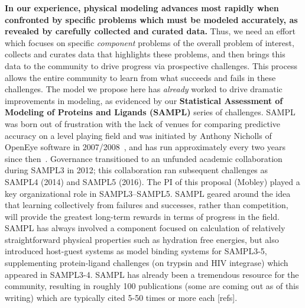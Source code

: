 \documentclass[11pt]{article}
\begin{document}
\textbf{In our experience, physical modeling advances most rapidly when confronted by specific problems which must be modeled accurately, as revealed by carefully collected and curated data.}
Thus, we need an effort which focuses on specific \emph{component} problems of the overall problem of interest, collects and curates data that highlights these problems, and then brings this data to the community to drive progress via prospective challenges.
This process allows the entire community to learn from what succeeds and fails in these challenges. 
The model we propose here has \emph{already} worked to drive dramatic improvements in modeling, as evidenced by our {\bf Statistical Assessment of Modeling of Proteins and Ligands (SAMPL)} series of challenges. 
SAMPL was born out of frustration with the lack of venues for comparing predictive accuracy on a level playing field and was initiated by Anthony Nicholls of OpenEye software in 2007/2008~\cite{nicholls_predicting_2008}, and has run approximately every two years since then~\cite{nicholls_samp1_2009, mobley_predictions_2009, geballe_sampl2_2010, geballe_sampl3_2012, mobley_blind_2014-1, muddana_sampl4_2014, bannan_blind_2016, yin_sampl5_preprint}.
Governance transitioned to an unfunded academic collaboration during SAMPL3 in 2012; this collaboration ran subsequent challenges as SAMPL4 (2014) and SAMPL5 (2016).
The PI of this proposal (Mobley) played a key organizational role in SAMPL3--SAMPL5.
SAMPL geared around the idea that learning collectively from failures and successes, rather than competition, will provide the greatest long-term rewards in terms of progress in the field.
SAMPL has always involved a component focused on calculation of relatively straightforward physical properties such as hydration free energies, but also introduced host-guest systems as model binding systems for SAMPL3-5, supplementing protein-ligand challenges (on trypsin and HIV integrase) which appeared in SAMPL3-4. 
SAMPL has already been a tremendous resource for the community, resulting in roughly 100 publications (some are coming out as of this writing) which are typically cited 5-50 times or more each [refs].
\end{document}
